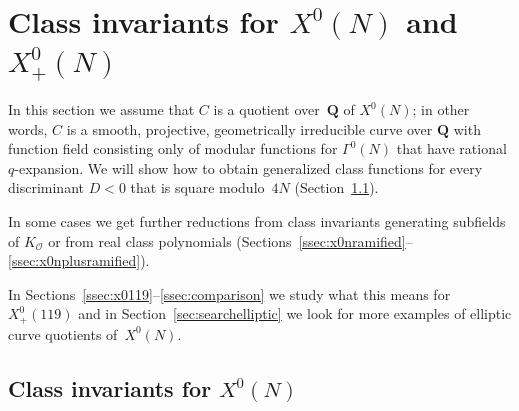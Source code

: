 \documentclass{amsart}
\newcommand{\QQ}{\mathbf{Q}}
\newcommand{\mc}{\mathcal}
\newcommand{\xnul}[1]{X^0(#1)}
\newcommand{\xnulN}{\xnul{N}}
\newcommand{\xplus}[1]{X^0_+(#1)}
\newcommand{\xplusN}{\xplus{N}}
\numberwithin{equation}{section}
\theoremstyle{definition}
\begin{document}
\section{\texorpdfstring{Class invariants for $\xnulN$ and $\xplusN$}{Class invariants for X0(N) and X0+(N)}}\label{sec:x0}


In this section we assume that $C$ is a quotient over~$\QQ$ of $\xnulN$;
in other words, $C$ is a smooth, projective, geometrically irreducible
curve over $\QQ$ with function field
consisting only of modular functions for $\Gamma^0(N)$
that have rational $q$-expansion.
We will show how to obtain generalized class functions for
every discriminant $D<0$ that is square
modulo~$4N$ (Section~\ref{ssec:x0n}).

In some cases we get further reductions from class invariants
generating subfields of $K_{\mc{O}}$ or from
real class polynomials (Sections~\ref{ssec:x0nramified}--\ref{ssec:x0nplusramified}).

In Sections~\ref{ssec:x0119}--\ref{ssec:comparison} we study what this means for $\xplus{119}$
and in Section~\ref{sec:searchelliptic} we look for more examples of elliptic curve quotients of~$\xnulN$.

\subsection{\texorpdfstring{Class invariants for $\xnulN$}{Class invariants for X0(N)}}
\label{ssec:x0n}
\end{document}
